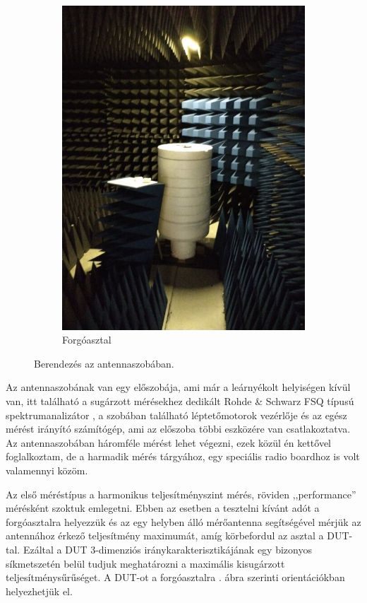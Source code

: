 \begin{figure}
\begin{subfigure}{0.4\textwidth}
                    \includegraphics[width=\textwidth]{kep/szerkesztett/antennaszoba-asztal.jpg}
                    \caption{Forgóasztal}
                \end{subfigure}
                \caption{Berendezés az antennaszobában.}
                \label{fig:antennaszoba}
            \end{figure}
            \par
            Az antennaszobának van egy előszobája, ami már a leárnyékolt helyiségen kívül van, itt található a sugárzott mérésekhez dedikált Rohde \& Schwarz FSQ típusú spektrumanalizátor \cite{FSQ}, a szobában található léptetőmotorok vezérlője és az egész mérést irányító számítógép, ami az előszoba többi eszközére van csatlakoztatva. Az antennaszobában háromféle mérést lehet végezni, ezek közül én kettővel foglalkoztam, de a harmadik mérés tárgyához, egy speciális radio boardhoz is volt valamennyi közöm.
            \par
            Az első méréstípus a harmonikus teljesítményszint mérés, röviden ,,performance'' mérésként szoktuk emlegetni. Ebben az esetben a tesztelni kívánt adót a forgóasztalra helyezzük és az egy helyben álló mérőantenna segítségével mérjük az antennához érkező teljesítmény maximumát, amíg körbefordul az asztal a DUT-tal. Ezáltal a DUT 3-dimenziós iránykarakterisztikájának egy bizonyos síkmetszetén belül tudjuk meghatározni a maximális kisugárzott teljesítménysűrűséget. A DUT-ot a forgóasztalra . ábra szerinti orientációkban helyezhetjük el.
